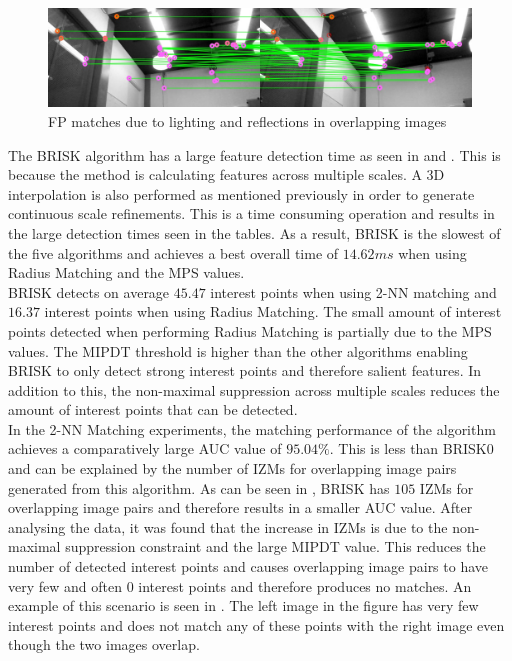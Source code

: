 \documentclass[11pt]{report}
\begin{document}
\begin{figure}
  \centering
    \includegraphics[width=1.0\textwidth]{../Drawings/Matching/reflectionsBrisk0.jpg}
    \caption{FP matches due to lighting and reflections in overlapping images} 
    \label{fig:reflectionsBrisk0}
\end{figure}


The BRISK algorithm has a large feature detection time as seen in  and . This is because the method is calculating features across multiple scales. A 3D interpolation is also performed as mentioned previously in order to generate continuous scale refinements. This is a time consuming operation and results in the large detection times seen in the tables. As a result, BRISK is the slowest of the five algorithms and achieves a best overall time of $14.62 ms$ when using Radius Matching and the MPS values.\\

BRISK detects on average $45.47$ interest points when using 2-NN matching and $16.37$ interest points when using Radius Matching. The small amount of interest points detected when performing Radius Matching is partially due to the MPS values. The MIPDT threshold is higher than the other algorithms enabling BRISK to only detect strong interest points and therefore salient features. In addition to this, the non-maximal suppression across multiple scales reduces the amount of interest points that can be detected.\\

In the 2-NN Matching experiments, the matching performance of the algorithm achieves a comparatively large AUC value of $95.04\%$. This is less than BRISK0 and can be explained by the number of IZMs for overlapping image pairs generated from this algorithm. As can be seen in , BRISK has $105$ IZMs for overlapping image pairs and therefore results in a smaller AUC value. After analysing the data, it was found that the increase in IZMs is due to the non-maximal suppression constraint and the large MIPDT value. This reduces the number of detected interest points and causes overlapping image pairs to have very few and often $0$ interest points and therefore produces no matches. An example of this scenario is seen in . The left image in the figure has very few interest points and does not match any of these points with the right image even though the two images overlap.\\
\end{document}
